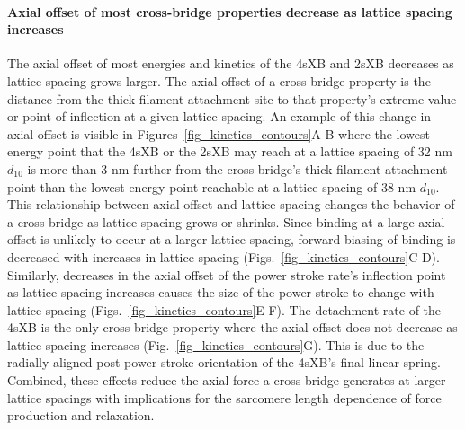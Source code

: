 \documentclass[]{article}
\begin{document}
\paragraph{Axial offset of most cross-bridge properties decrease as lattice spacing increases} %
The axial offset of most energies and kinetics of the 4sXB and 2sXB decreases as lattice spacing grows larger.
The axial offset of a cross-bridge property is the distance from the thick filament attachment site to that property's extreme value or point of inflection at a given lattice spacing. 
An example of this change in axial offset is visible in Figures~\ref{fig_kinetics_contours}A-B where the lowest energy point that the 4sXB or the 2sXB may reach at a lattice spacing of 32 nm $d_{10}$ is more than 3 nm further from the cross-bridge's thick filament attachment point than the lowest energy point reachable at a lattice spacing of 38 nm $d_{10}$.
This relationship between axial offset and lattice spacing changes the behavior of a cross-bridge as lattice spacing grows or shrinks.
Since binding at a large axial offset is unlikely to occur at a larger lattice spacing, forward biasing of binding is decreased with increases in lattice spacing (Figs.~\ref{fig_kinetics_contours}C-D). 
Similarly, decreases in the axial offset of the power stroke rate's inflection point as lattice spacing increases causes the size of the power stroke to change with lattice spacing (Figs.~\ref{fig_kinetics_contours}E-F).
The detachment rate of the 4sXB is the only cross-bridge property where the axial offset does not decrease as lattice spacing increases (Fig.~\ref{fig_kinetics_contours}G).
This is due to the radially aligned post-power stroke orientation of the 4sXB's final linear spring. 
Combined, these effects reduce the axial force a cross-bridge generates at larger lattice spacings with implications for the sarcomere length dependence of force production and relaxation. 
\end{document}
